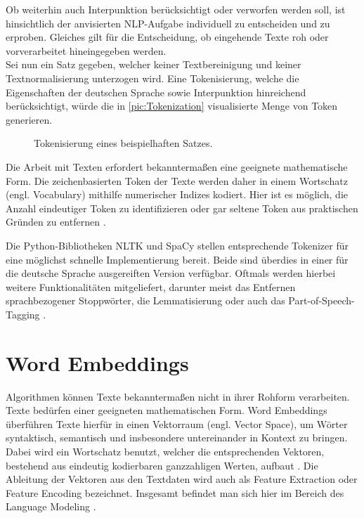 \noindent
Ob weiterhin auch Interpunktion berücksichtigt oder verworfen werden soll, ist hinsichtlich der anvisierten \ac{NLP}-Aufgabe individuell zu entscheiden und zu erproben. Gleiches gilt für die Entscheidung, ob eingehende Texte roh oder vorverarbeitet hineingegeben werden.\\

\noindent
Sei nun ein Satz gegeben, welcher keiner Textbereinigung und keiner Textnormalisierung unterzogen wird. Eine Tokenisierung, welche die Eigenschaften der deutschen Sprache sowie Interpunktion hinreichend berücksichtigt, würde die in \autoref{pic:Tokenization} visualisierte Menge von Token generieren.

\begin{figure}[h!]
  \centering
  \caption{Tokenisierung eines beispielhaften Satzes.}
  \label{pic:Tokenization}
\end{figure}

\noindent
Die Arbeit mit Texten erfordert bekanntermaßen eine geeignete mathematische Form. Die zeichenbasierten Token der Texte werden daher in einem Wortschatz (engl. Vocabulary) mithilfe numerischer Indizes kodiert. Hier ist es möglich, die Anzahl eindeutiger Token zu identifizieren oder gar seltene Token aus praktischen Gründen zu entfernen \cite[S.~311-312]{ZHA20}.
\newpage

\noindent
Die Python-Bibliotheken \ac{NLTK} und SpaCy stellen entsprechende Tokenizer für eine möglichst schnelle Implementierung bereit. Beide sind überdies in einer für die deutsche Sprache ausgereiften Version verfügbar. Oftmals werden hierbei weitere Funktionalitäten mitgeliefert, darunter meist das Entfernen sprachbezogener Stoppwörter, die Lemmatisierung oder auch das Part-of-Speech-Tagging \cite[S.~111]{BIR09}.


\section{Word Embeddings}
\noindent
Algorithmen können Texte bekanntermaßen nicht in ihrer Rohform verarbeiten. Texte bedürfen einer geeigneten mathematischen Form. Word Embeddings überführen Texte hierfür in einen Vektorraum (engl. Vector Space), um Wörter syntaktisch, semantisch und insbesondere untereinander in Kontext zu bringen. Dabei wird ein Wortschatz benutzt, welcher die entsprechenden Vektoren, bestehend aus eindeutig kodierbaren ganzzahligen Werten, aufbaut \cite{KAR18}. Die Ableitung der Vektoren aus den Textdaten wird auch als Feature Extraction oder Feature Encoding bezeichnet. Insgesamt befindet man sich hier im Bereich des Language Modeling \cite{BRO19}.\\

